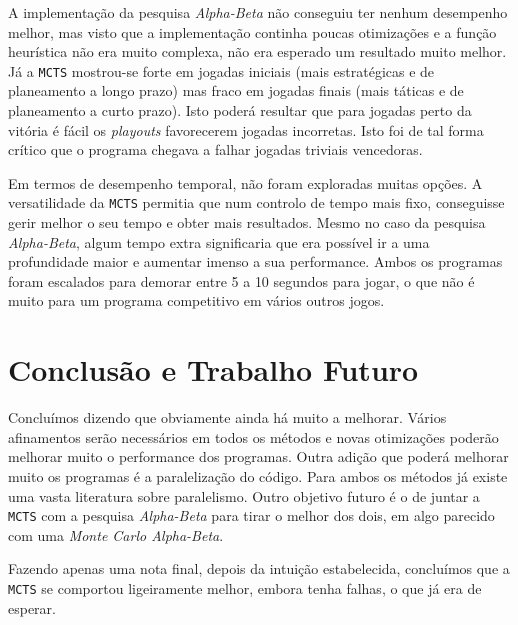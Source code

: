 \documentclass[12pt,a4paper,oneside]{article}
\begin{document}
A implementação da pesquisa \textit{Alpha-Beta} não conseguiu ter nenhum
desempenho melhor, mas visto que a implementação continha poucas
otimizações e a função heurística não era muito complexa, não era
esperado um resultado muito melhor. Já a \texttt{MCTS} mostrou-se
forte em jogadas iniciais (mais estratégicas e de planeamento a longo
prazo) mas fraco em jogadas finais (mais táticas e de planeamento a
curto prazo). Isto poderá resultar que para jogadas perto da vitória é
fácil os \textit{playouts} favorecerem jogadas incorretas. Isto foi de
tal forma crítico que o programa chegava a falhar jogadas triviais
vencedoras.

Em termos de desempenho temporal, não foram exploradas muitas
opções. A versatilidade da \texttt{MCTS} permitia que num controlo de
tempo mais fixo, conseguisse gerir melhor o seu tempo e obter mais
resultados. Mesmo no caso da pesquisa \textit{Alpha-Beta}, algum tempo
extra significaria que era possível ir a uma profundidade maior e
aumentar imenso a sua performance. Ambos os programas foram escalados
para demorar entre 5 a 10 segundos para jogar, o que não é muito para
um programa competitivo em vários outros jogos.


\section{Conclusão e Trabalho Futuro}
\label{sec:conc}


Concluímos dizendo que obviamente ainda há muito a melhorar. Vários
afinamentos serão necessários em todos os métodos e novas otimizações
poderão melhorar muito o performance dos programas. Outra adição que
poderá melhorar muito os programas é a paralelização do código. Para
ambos os métodos já existe uma vasta literatura sobre
paralelismo. Outro objetivo futuro é o de juntar a \texttt{MCTS} com a
pesquisa \textit{Alpha-Beta} para tirar o melhor dos dois, em algo
parecido com uma \textit{Monte Carlo Alpha-Beta}.

Fazendo apenas uma nota final, depois da intuição estabelecida,
concluímos que a \texttt{MCTS} se comportou ligeiramente melhor,
embora tenha falhas, o que já era de esperar.



\end{document}
